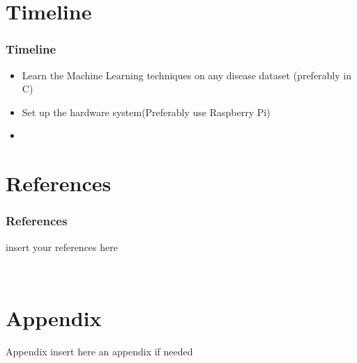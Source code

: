 \documentclass{beamer}
\begin{document}
\section{Timeline}
\begin{frame}[allowframebreaks]
\frametitle{Timeline}\scriptsize

\begin{itemize}
    \item {Learn the Machine Learning techniques on any disease dataset (preferably in C)}
    \item {Set up the hardware system(Preferably use Raspberry Pi)}
    \item {}
\end{itemize}

\end{frame}



\section{References}
\begin{frame}[allowframebreaks]
\frametitle{References}\scriptsize

insert your references here


\end{frame}


\begingroup
{
\begin{frame}[c]
\vfill
\begin{center}
\Large\textcolor{white}{Thank you}
\end{center}
\vfill
\end{frame}
} 

\endgroup


\section{Appendix}
\begin{frame}{Appendix}
    insert here an appendix if needed
\end{frame}
\end{document}
